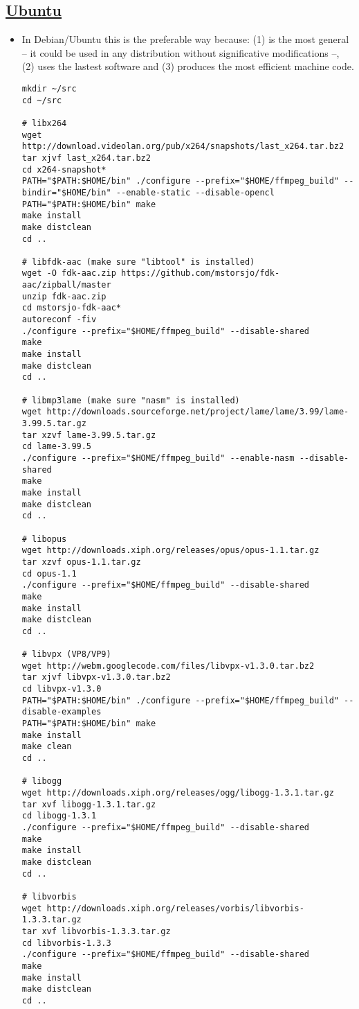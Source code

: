 \subsection{\href{https://trac.ffmpeg.org/wiki/CompilationGuide/Ubuntu}{Ubuntu}}

\begin{itemize}
\item In Debian/Ubuntu this is the preferable way because: (1) is the most general --
  it could be used in any distribution without significative
  modifications --, (2) uses the lastest software and (3) produces the
  most efficient machine code.
\begin{verbatim}
mkdir ~/src
cd ~/src

# libx264
wget http://download.videolan.org/pub/x264/snapshots/last_x264.tar.bz2
tar xjvf last_x264.tar.bz2
cd x264-snapshot*
PATH="$PATH:$HOME/bin" ./configure --prefix="$HOME/ffmpeg_build" --bindir="$HOME/bin" --enable-static --disable-opencl
PATH="$PATH:$HOME/bin" make
make install
make distclean
cd ..

# libfdk-aac (make sure "libtool" is installed)
wget -O fdk-aac.zip https://github.com/mstorsjo/fdk-aac/zipball/master
unzip fdk-aac.zip
cd mstorsjo-fdk-aac*
autoreconf -fiv
./configure --prefix="$HOME/ffmpeg_build" --disable-shared
make
make install
make distclean
cd ..

# libmp3lame (make sure "nasm" is installed)
wget http://downloads.sourceforge.net/project/lame/lame/3.99/lame-3.99.5.tar.gz
tar xzvf lame-3.99.5.tar.gz
cd lame-3.99.5
./configure --prefix="$HOME/ffmpeg_build" --enable-nasm --disable-shared
make
make install
make distclean
cd ..

# libopus
wget http://downloads.xiph.org/releases/opus/opus-1.1.tar.gz
tar xzvf opus-1.1.tar.gz
cd opus-1.1
./configure --prefix="$HOME/ffmpeg_build" --disable-shared
make
make install
make distclean
cd ..

# libvpx (VP8/VP9)
wget http://webm.googlecode.com/files/libvpx-v1.3.0.tar.bz2
tar xjvf libvpx-v1.3.0.tar.bz2
cd libvpx-v1.3.0
PATH="$PATH:$HOME/bin" ./configure --prefix="$HOME/ffmpeg_build" --disable-examples
PATH="$PATH:$HOME/bin" make
make install
make clean
cd ..

# libogg
wget http://downloads.xiph.org/releases/ogg/libogg-1.3.1.tar.gz
tar xvf libogg-1.3.1.tar.gz
cd libogg-1.3.1
./configure --prefix="$HOME/ffmpeg_build" --disable-shared
make
make install
make distclean
cd ..

# libvorbis
wget http://downloads.xiph.org/releases/vorbis/libvorbis-1.3.3.tar.gz
tar xvf libvorbis-1.3.3.tar.gz
cd libvorbis-1.3.3
./configure --prefix="$HOME/ffmpeg_build" --disable-shared
make
make install
make distclean
cd ..


\end{verbatim}
\end{itemize}
